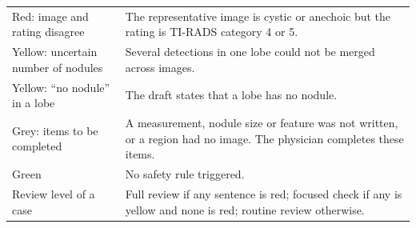 \begin{table}[p]
\begin{threeparttable}
\begin{tabular}{>{\raggedright\arraybackslash}p{}>{\raggedright\arraybackslash}p{}}
Red: image and rating disagree & The representative image is cystic or anechoic but the rating is TI-RADS category 4 or 5. \\
Yellow: uncertain number of nodules & Several detections in one lobe could not be merged across images. \\
Yellow: ``no nodule'' in a lobe & The draft states that a lobe has no nodule. \\
Grey: items to be completed & A measurement, nodule size or feature was not written, or a region had no image. The physician completes these items. \\
Green & No safety rule triggered. \\
Review level of a case & Full review if any sentence is red; focused check if any is yellow and none is red; routine review otherwise. \\
\bottomrule
\end{tabular}

\end{threeparttable}
\end{table}
